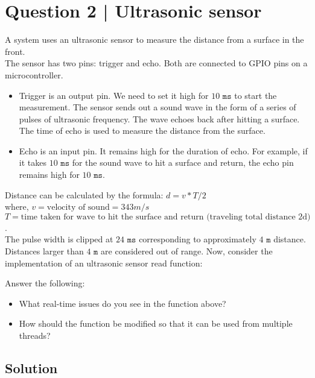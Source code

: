 \section*{Question 2 | Ultrasonic sensor}

A system uses an ultrasonic sensor to measure the distance from a surface in the front. \\
The sensor has two pins: trigger and echo.
Both are connected to GPIO pins on a microcontroller.
\begin{itemize}[noitemsep, topsep=0pt, leftmargin=*]
    \item
          Trigger is an output pin.
          We need to set it high for \( 10 \texttt{ ms} \) to start the measurement.
          The sensor sends out a sound wave in the form of a series of pulses of ultrasonic frequency.
          The wave echoes back after hitting a surface.
          The time of echo is used to measure the distance from the surface.
    \item
          Echo is an input pin.
          It remains high for the duration of echo.
          For example, if it takes \( 10 \texttt{ ms} \) for the sound wave to hit a surface and return, the echo pin remains high for \( 10 \texttt{ ms} \).
\end{itemize}
Distance can be calculated by the formula: \( d = v * T / 2 \) \\
where, \( v = \text{velocity of sound} = 343 m/s \) \\
\( T = \text{time taken for wave to hit the surface and return (traveling total distance 2d)} \). \\
The pulse width is clipped at \( 24 \texttt{ ms} \) corresponding to approximately \( 4 \texttt{ m} \) distance.
Distances larger than \( 4 \texttt{ m} \) are considered out of range.
Now, consider the implementation of an ultrasonic sensor read function:

Answer the following:
\begin{itemize}[noitemsep, topsep=0pt]
    \item What real-time issues do you see in the function above?
    \item How should the function be modified so that it can be used from multiple threads?
\end{itemize}

\vspace*{-1em}
\subsection*{Solution}

